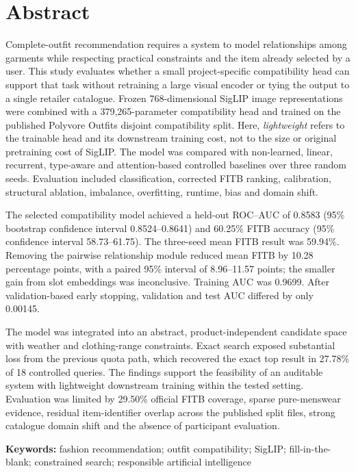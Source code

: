\chapter*{Abstract}

Complete-outfit recommendation requires a system to model relationships among
garments while respecting practical constraints and the item already selected
by a user. This study evaluates whether a small project-specific compatibility
head can support that task without retraining a large visual encoder or tying
the output to a single retailer catalogue. Frozen 768-dimensional SigLIP image
representations were combined with a 379,265-parameter compatibility head and
trained on the published Polyvore Outfits disjoint compatibility split. Here,
\emph{lightweight} refers to the trainable head and its downstream training
cost, not to the size or original pretraining cost of SigLIP. The
model was compared with non-learned, linear, recurrent, type-aware and
attention-based controlled baselines over three random seeds. Evaluation included
classification, corrected FITB ranking, calibration, structural ablation,
imbalance, overfitting, runtime, bias and domain shift.

The selected compatibility model achieved a held-out ROC--AUC of 0.8583 (95\%
bootstrap confidence interval 0.8524--0.8641) and 60.25\% FITB accuracy (95\%
confidence interval 58.73--61.75). The three-seed mean FITB result was 59.94\%.
Removing the pairwise relationship module reduced mean FITB by 10.28 percentage
points, with a paired 95\% interval of 8.96--11.57 points; the smaller gain from
slot embeddings was inconclusive. Training AUC was 0.9699. After
validation-based early stopping, validation and test AUC differed by only
0.00145.

The model was integrated into an abstract, product-independent candidate space
with weather and clothing-range constraints. Exact search exposed substantial
loss from the previous quota path, which recovered the exact top result in
27.78\% of 18 controlled queries. The findings support the feasibility of an
auditable system with lightweight downstream training within the tested
setting. Evaluation was limited by 29.50\% official FITB coverage, sparse
pure-menswear evidence, residual item-identifier overlap across the published
split files, strong catalogue domain shift and the absence of participant
evaluation.

\textbf{Keywords:} fashion recommendation; outfit compatibility; SigLIP;
fill-in-the-blank; constrained search; responsible artificial intelligence

\clearpage
